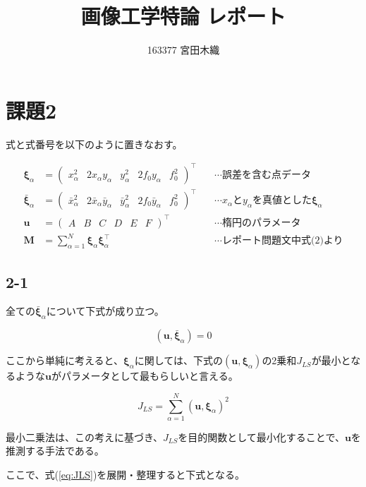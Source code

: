 \documentclass[12pt,a4j]{jsarticle}
\title{画像工学特論 レポート}
\author{163377 宮田木織}
\newcommand{\xa}{x_\alpha}
\newcommand{\bxa}{\bar{x}_\alpha}
\newcommand{\ya}{y_\alpha}
\newcommand{\bya}{\bar{y}_\alpha}
\newcommand{\xia}{\bm{\xi}_\alpha}
\newcommand{\bxia}{\bar{\bm{\xi}}_\alpha}
\begin{document}
  \maketitle %

\section*{課題2}
  式と式番号を以下のように置きなおす。

  \begin{align}
    \xia &= \begin{pmatrix}\xa^2 & 2\xa\ya & \ya^2 & 2f_0\ya & f_0^2\end{pmatrix}^\top
     & \quad\cdots\text{誤差を含む点データ} \\
    \bxia &= \begin{pmatrix}\bxa^2 & 2\bxa\bya & \bya^2 & 2f_0\bya & f_0^2\end{pmatrix}^\top
     & \quad\cdots\text{$\xa$と$\ya$を真値とした$\xia$} \\
    \bm{u} &= \begin{pmatrix}A & B & C & D & E & F\end{pmatrix}^\top
     & \quad\cdots\text{楕円のパラメータ} \\
    \bm{M} &= \sum_{\alpha = 1}^N \xia \xia^\top
     & \quad\cdots\text{レポート問題文中式(2)より} \label{eq:M}
  \end{align}

  \subsection*{2-1}

  全ての$\bxia$について下式が成り立つ。

  \begin{equation}
    (\bm{u}, \bxia) = 0
  \end{equation}

  ここから単純に考えると、$\xia$に関しては、下式の$(\bm{u}, \xia)$の2乗和$J_{LS}$が最小となるような$\bm{u}$がパラメータとして最もらしいと言える。

  \begin{equation}
    J_{LS} = \sum_{\alpha = 1}^N (\bm{u}, \xia)^2 \label{eq:JLS}
  \end{equation}

  最小二乗法は、この考えに基づき、$J_{LS}$を目的関数として最小化することで、$\bm{u}$を推測する手法である。\par
  ここで、式(\ref{eq:JLS})を展開・整理すると下式となる。
\end{document}
